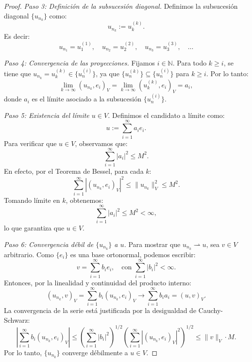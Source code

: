 \documentclass[12pt]{book}
\theoremstyle{definition}
\theoremstyle{plain}
\theoremstyle{remark}
\begin{document}
\begin{proof}
\medskip

\noindent \emph{Paso 3: Definición de la subsucesión diagonal.}
Definimos la {subsucesión diagonal} \( \{u_{n_k}\} \) como:
\[
u_{n_k} := u_k^{(k)}.
\]
Es decir:
\[
u_{n_1} = u_1^{(1)}, \quad u_{n_2} = u_2^{(2)}, \quad u_{n_3} = u_3^{(3)}, \quad \dots
\]

\medskip

\noindent \emph{Paso 4: Convergencia de las proyecciones.}
Fijamos \( i \in \mathbb{N} \). Para todo \( k \geq i \), se tiene que \( u_{n_k} = u_k^{(k)} \in \{u_n^{(i)}\} \), ya que \( \{u_n^{(k)}\} \subseteq \{u_n^{(i)}\} \) para \( k \geq i \). Por lo tanto:
\[
\lim_{k \to \infty} ( u_{n_k}, e_i )_V = \lim_{k \to \infty} ( u_k^{(k)}, e_i )_V = a_i,
\]
donde \( a_i \) es el límite asociado a la subsucesión \( \{u_n^{(i)}\} \).

\medskip

\noindent \emph{Paso 5: Existencia del límite \( u \in V \).}
Definimos el candidato a límite como:
\[
u := \sum_{i=1}^\infty a_i e_i.
\]
Para verificar que \( u \in V \), observamos que:
\[
\sum_{i=1}^\infty |a_i|^2 \leq M^2.
\]
En efecto, por el {Teorema de Bessel}, para cada \( k \):
\[
\sum_{i=1}^\infty |( u_{n_k}, e_i )_V|^2 \leq \|u_{n_k}\|_V^2 \leq M^2.
\]
Tomando límite en \( k \), obtenemos:
\[
\sum_{i=1}^\infty |a_i|^2 \leq M^2 < \infty,
\]
lo que garantiza que \( u \in V \).

\medskip

\noindent \emph{Paso 6: Convergencia débil de \( \{u_{n_k}\} \) a \( u \).}
Para mostrar que \( u_{n_k} \rightharpoonup u \), sea \( v \in V \) arbitrario. Como \( \{e_i\} \) es una base ortonormal, podemos escribir:
\[
v = \sum_{i=1}^\infty b_i e_i, \quad \text{con } \sum_{i=1}^\infty |b_i|^2 < \infty.
\]
Entonces, por la linealidad y continuidad del producto interno:
\[
( u_{n_k}, v )_V = \sum_{i=1}^\infty b_i ( u_{n_k}, e_i )_V \to \sum_{i=1}^\infty b_i a_i = ( u, v )_V.
\]
La convergencia de la serie está justificada por la {desigualdad de Cauchy-Schwarz}:
\[
\left| \sum_{i=1}^\infty b_i ( u_{n_k}, e_i )_V \right| \leq \left( \sum_{i=1}^\infty |b_i|^2 \right)^{1/2} \left( \sum_{i=1}^\infty |( u_{n_k}, e_i )_V|^2 \right)^{1/2} \leq \|v\|_V \cdot M.
\]
Por lo tanto, \( \{u_{n_k}\} \) converge débilmente a \( u \in V \).
\end{proof}

\end{document}
